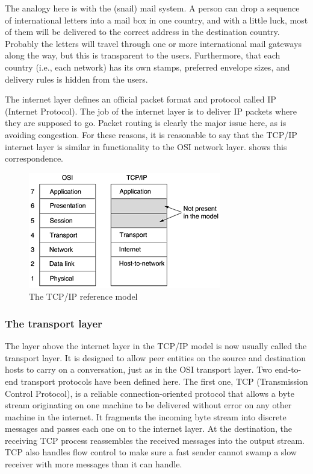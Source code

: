 \documentclass[b5paper,11pt]{memoir}
\begin{document}
The analogy here is with the (snail) mail system. A person can drop a
sequence of international letters into a mail box in one country, and
with a little luck, most of them will be delivered to the correct
address in the destination country. Probably the letters will travel
through one or more international mail gateways along the way, but this
is transparent to the users. Furthermore, that each country (i.e., each
network) has its own stamps, preferred envelope sizes, and delivery
rules is hidden from the users.

The internet layer defines an official packet format and protocol called
{IP} ({Internet Protocol}). The job of the internet layer is to deliver
IP packets where they are supposed to go. Packet routing is clearly the
major issue here, as is avoiding congestion. For these reasons, it is
reasonable to say that the TCP/IP internet layer is similar in
functionality to the OSI network layer.
 shows this correspondence.


\begin{figure}
   \centering
   \includegraphics[width=.8\textwidth]{images/01fig21.png}
   \caption{The TCP/IP reference model}
   \label{fig:tcpip-model}
\end{figure}


\subsubsection{The transport layer}

The layer above the internet layer in the TCP/IP model is now usually
called the {transport layer}. It is designed to allow peer entities on
the source and destination hosts to carry on a conversation, just as in
the OSI transport layer. Two end-to-end transport protocols have been
defined here. The first one, {TCP} ({Transmission Control Protocol}), is
a reliable connection-oriented protocol that allows a byte stream
originating on one machine to be delivered without error on any other
machine in the internet. It fragments the incoming byte stream into
discrete messages and passes each one on to the internet layer. At the
destination, the receiving TCP process reassembles the received messages
into the output stream. TCP also handles flow control to make sure a
fast sender cannot swamp a slow receiver with more messages than it can
handle.
\end{document}
